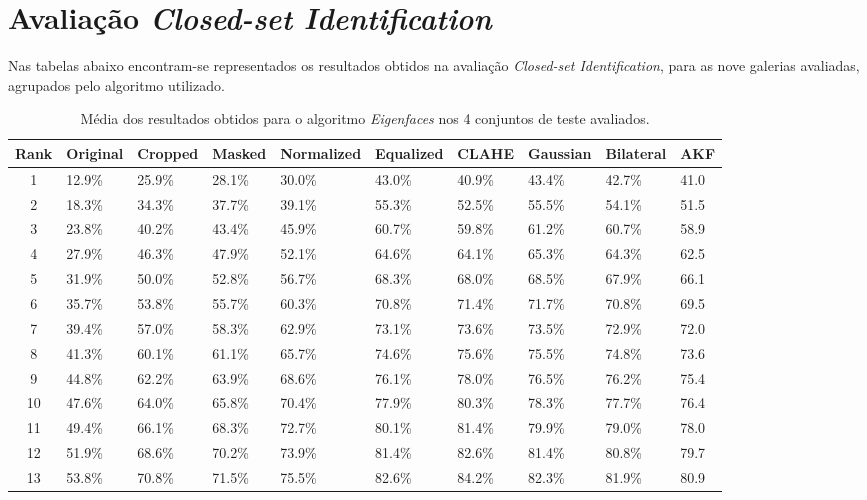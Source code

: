 \chapter{Avaliação \textit{Closed-set Identification}} \label{ap1:closed-set}
Nas tabelas abaixo encontram-se representados os resultados obtidos na avaliação \textit{Closed-set Identification}, para as nove galerias avaliadas, agrupados pelo algoritmo utilizado.

\begin{table}[h]
    \begin{center}
    \caption{Média dos resultados obtidos para o algoritmo \textit{Eigenfaces} nos 4 conjuntos de teste avaliados.}	
	\begin{tabular}{c|p{1.2cm}p{1.1cm}p{1.1cm}p{1.7cm}p{1.5cm}p{1.2cm}p{1.2cm}p{1.2cm}p{1.2cm}}
	Rank & Original & Cropped & Masked & Normalized & Equalized & CLAHE & Gaussian & Bilateral & AKF \\ 
	\hline\hline
	1 & 12.9\% & 25.9\% & 28.1\% & 30.0\% & 43.0\% & 40.9\% & 43.4\% & 42.7\% & 41.0 \\ 
	2 & 18.3\% & 34.3\% & 37.7\% & 39.1\% & 55.3\% & 52.5\% & 55.5\% & 54.1\% & 51.5 \\ 
	3 & 23.8\% & 40.2\% & 43.4\% & 45.9\% & 60.7\% & 59.8\% & 61.2\% & 60.7\% & 58.9 \\ 
	4 & 27.9\% & 46.3\% & 47.9\% & 52.1\% & 64.6\% & 64.1\% & 65.3\% & 64.3\% & 62.5 \\ 
	5 & 31.9\% & 50.0\% & 52.8\% & 56.7\% & 68.3\% & 68.0\% & 68.5\% & 67.9\% & 66.1 \\ 
	6 & 35.7\% & 53.8\% & 55.7\% & 60.3\% & 70.8\% & 71.4\% & 71.7\% & 70.8\% & 69.5 \\ 
	7 & 39.4\% & 57.0\% & 58.3\% & 62.9\% & 73.1\% & 73.6\% & 73.5\% & 72.9\% & 72.0 \\ 
	8 & 41.3\% & 60.1\% & 61.1\% & 65.7\% & 74.6\% & 75.6\% & 75.5\% & 74.8\% & 73.6 \\ 
	9 & 44.8\% & 62.2\% & 63.9\% & 68.6\% & 76.1\% & 78.0\% & 76.5\% & 76.2\% & 75.4 \\ 
	10 & 47.6\% & 64.0\% & 65.8\% & 70.4\% & 77.9\% & 80.3\% & 78.3\% & 77.7\% & 76.4 \\ 
	11 & 49.4\% & 66.1\% & 68.3\% & 72.7\% & 80.1\% & 81.4\% & 79.9\% & 79.0\% & 78.0 \\ 
	12 & 51.9\% & 68.6\% & 70.2\% & 73.9\% & 81.4\% & 82.6\% & 81.4\% & 80.8\% & 79.7 \\ 
	13 & 53.8\% & 70.8\% & 71.5\% & 75.5\% & 82.6\% & 84.2\% & 82.3\% & 81.9\% & 80.9 \\ 

\end{tabular}
\end{center}
\end{table}
